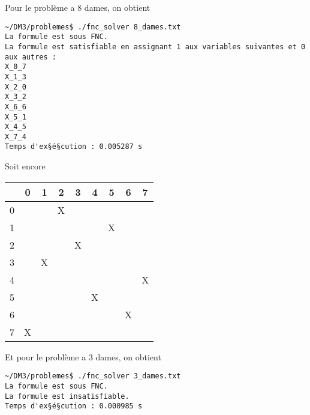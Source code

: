     Pour le problème a 8 dames, on obtient
    \begin{lstlisting}
~/DM3/problemes$ ./fnc_solver 8_dames.txt 
La formule est sous FNC.
La formule est satisfiable en assignant 1 aux variables suivantes et 0 aux autres :
X_0_7
X_1_3
X_2_0
X_3_2
X_6_6
X_5_1
X_4_5
X_7_4
Temps d'ex§é§cution : 0.005287 s
    \end{lstlisting}
    Soit encore
    \begin{center}
        \begin{tabular}{| c || *{8}{c |}}
        \hline
          & 0 & 1 & 2 & 3 & 4 & 5 & 6 & 7 \\
        \hline
        \hline
        0 &   &   & X &   &   &   &   &   \\
        \hline
        1 &   &   &   &   &   & X &   &   \\
        \hline
        2 &   &   &   & X &   &   &   &   \\
        \hline
        3 &   & X &   &   &   &   &   &   \\
        \hline
        4 &   &   &   &   &   &   &   & X \\
        \hline
        5 &   &   &   &   & X &   &   &   \\
        \hline
        6 &   &   &   &   &   &   & X &   \\
        \hline
        7 & X &   &   &   &   &   &   &   \\
        \hline
        \end{tabular}
    \end{center}
    
    Et pour le problème a 3 dames, on obtient
    \begin{lstlisting}
~/DM3/problemes$ ./fnc_solver 3_dames.txt 
La formule est sous FNC.
La formule est insatisfiable.
Temps d'ex§é§cution : 0.000985 s
    \end{lstlisting}

